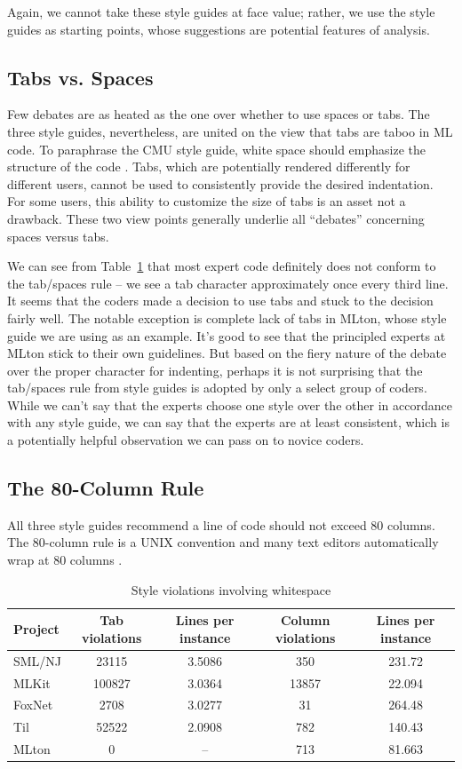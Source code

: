 \documentclass[12pt,abstracton]{scrartcl}
\begin{document}
Again, we cannot take these style guides at face value; rather, we use
the style guides as starting points, whose suggestions are potential
features of analysis.
\subsection{Tabs vs. Spaces}\label{subsec:tab}
Few debates are as heated as the one over whether to use spaces or tabs. The three style guides, nevertheless, are
united on the view that tabs are taboo in ML code. To paraphrase the CMU
style guide, white space should emphasize the structure of the code \cite{Cmu12}.
Tabs, which are potentially rendered differently for
different users, cannot be used to consistently provide the desired indentation.
For some users, this ability to customize the size of tabs is an asset not
a drawback. These two view points generally underlie all ``debates'' concerning spaces versus tabs.

We can see from Table~\ref{table:whitespace} that most expert code definitely does
not conform to the tab/spaces rule -- we see a tab character approximately once every third line.
It seems that the coders made a decision to use tabs and stuck to the decision fairly well.
The notable exception is complete lack of tabs in MLton, whose style guide we are using as an example.
It's good to see that the principled experts at MLton stick to their own guidelines.
But based on the fiery nature of the debate over the proper character
for indenting, perhaps it is not surprising that the tab/spaces
rule from style guides is adopted by only a select group of coders.
While we can't say that the experts choose one style over the other in accordance with
any style guide, we can say that the experts are at least consistent, which is
a potentially helpful observation we can pass on to novice coders.
\subsection{The 80-Column Rule}\label{subsec:80}
All three style guides recommend a line of code should not exceed 80 columns.
The 80-column rule is a UNIX convention and many text editors automatically
wrap at 80 columns \cite{Cmu12}.

\begin{table}[t!]
\centering
\begin{tabular}{|l||c|c||c|c|}
\hline
Project & Tab violations & Lines per instance & Column violations & Lines per instance \\ \hline\hline
SML/NJ & 23115 & 3.5086 & 350 & 231.72 \\
MLKit & 100827 & 3.0364 & 13857 & 22.094 \\
FoxNet & 2708 & 3.0277 & 31 & 264.48 \\
Til & 52522 & 2.0908 & 782 & 140.43 \\
MLton & 0 & -- & 713 & 81.663 \\ \hline
\end{tabular}
\caption{Style violations involving whitespace}
\label{table:whitespace}
\end{table}
\end{document}
